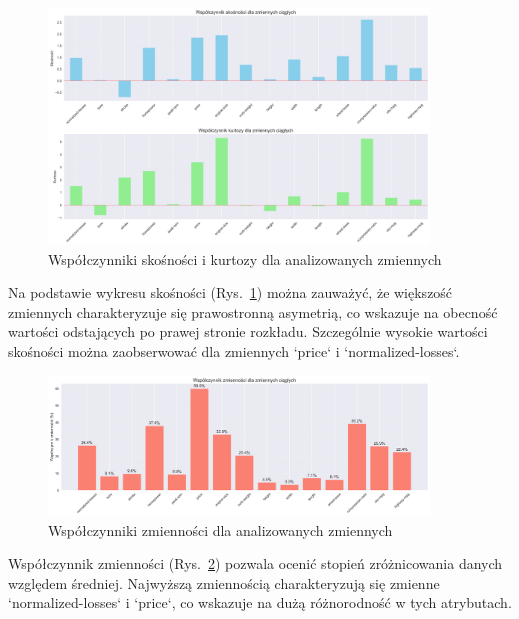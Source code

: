 \documentclass[12pt,a4paper]{article}
\begin{document}
\begin{figure}[H]
    \centering
    \includegraphics[width=0.9\textwidth]{figures/skosnosc_kurtoza.png}
    \caption{Współczynniki skośności i kurtozy dla analizowanych zmiennych}
    \label{fig:skosnosc_kurtoza}
\end{figure}

Na podstawie wykresu skośności (Rys.~\ref{fig:skosnosc_kurtoza}) można zauważyć, że większość zmiennych charakteryzuje się prawostronną asymetrią, co wskazuje na obecność wartości odstających po prawej stronie rozkładu. Szczególnie wysokie wartości skośności można zaobserwować dla zmiennych `price` i `normalized-losses`.

\begin{figure}[H]
    \centering
    \includegraphics[width=0.9\textwidth]{figures/wspolczynnik_zmiennosci.png}
    \caption{Współczynniki zmienności dla analizowanych zmiennych}
    \label{fig:wspolczynnik_zmiennosci}
\end{figure}

Współczynnik zmienności (Rys.~\ref{fig:wspolczynnik_zmiennosci}) pozwala ocenić stopień zróżnicowania danych względem średniej. Najwyższą zmiennością charakteryzują się zmienne `normalized-losses` i `price`, co wskazuje na dużą różnorodność w tych atrybutach.
\end{document}
